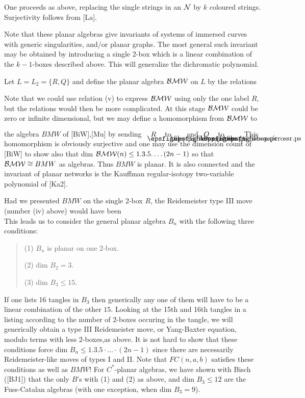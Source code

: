 \noindent One proceeds as above, replacing the single strings in an
$\cal N$ by $k$ coloured strings. Surjectivity follows from
[La].

Note that these planar algebras give
invariants of systems of immersed curves with generic
singularities, and/or planar graphs. The most general such
invariant may be obtained by introducing a single 2-box which is a
linear combination of the $k-1$-boxes described above. This will
generalize the dichromatic polynomial.

Let $L=L_2=\{R,Q\}$ and define the planar algebra $\cal B\cal M\cal
W$ on $L$ by the relations
%        

        


        


        


        


        

Note that we could use relation (v) to express $\cal B\cal M\cal
W$ using only the one label $R$, but the relations would then be
more complicated. At this stage $\cal B\cal M\cal
W$ could be zero or infinite dimensional, but we may define a homomorphism from $\cal B\cal M\cal
W$ to the algebra $BMW$ of [BiW],[Mu] by sending \
$\blankbox{R}$ to $\crss$ and  $\blankbox{Q}$ to $\crssr$ .
This homomorphism is obviously surjective and one may use the
dimension count of [BiW] to show also that
dim ${\cal BMW}(n)\leq 1.3.5.\dots(2n-1)$ so that
${\cal BMW}\cong BMW$ as algebras. Thus $BMW$ is planar.
It is also connected and the invariant of planar networks is the
Kauffman regular-isotopy two-variable polynomial of [Ka2].

 Had we presented $BMW$ on the single 2-box
$R$, the Reidemeister type III move (number (iv) above) would have
been
\[
        
\]
\noindent
This leads us to consider the general planar algebra $B_n$ with the
following three conditions:
\begin{verse}
(1) $B_n$ is planar on one 2-box.

(2) dim $B_2=3$.

(3) dim $B_3\leq 15$.
\end{verse}
If one lists 16 tangles in $B_3$ then generically any one of them
will have to be a linear combination of the other $15$. Looking at
the 15th and 16th tangles in a listing according to the number of
2-boxes occuring in the tangle, we will generically obtain a type III Reidemeister 
move, or Yang-Baxter equation, modulo terms with less 2-boxes,as above.
It is not hard to show that these conditions force
dim $B_n\leq 1.3.5\cdot\dots \cdot (2n-1)$ since there are
necessarily Reidemeister-like moves of types I and II.
Note that $FC(n,a,b)$ satisfies these conditions as well as $BMW$!
For $C^*$-planar algebras, we have shown with Bisch
([BJ1]) that the only $B$'s with (1) and (2) as above,
and dim $B_3\leq 12$ are the Fuss-Catalan algebras  (with one
exception, when dim $B_3=9$).

